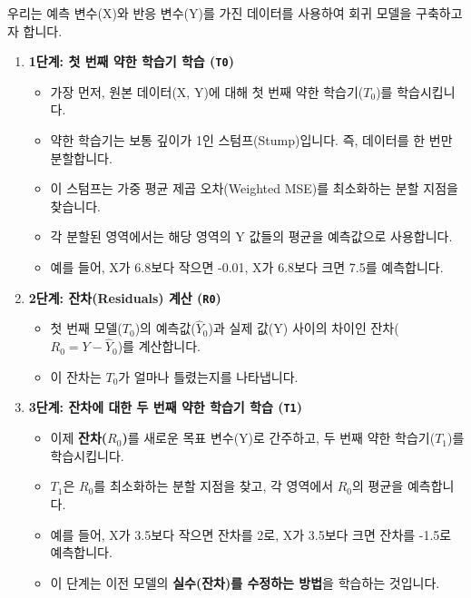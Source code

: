 \documentclass[11pt,a4paper]{book}
\theoremstyle{definition}
\begin{document}
\begin{tcolorbox}[example, title={회귀 문제 예시}] %
우리는 예측 변수(X)와 반응 변수(Y)를 가진 데이터를 사용하여 회귀 모델을 구축하고자 합니다.

\begin{enumerate}
    \item \textbf{1단계: 첫 번째 약한 학습기 학습 (\texttt{T0})}
    \begin{itemize}
        \item 가장 먼저, 원본 데이터(X, Y)에 대해 첫 번째 약한 학습기($T_0$)를 학습시킵니다.
        \item 약한 학습기는 보통 깊이가 1인 스텀프(Stump)입니다. 즉, 데이터를 한 번만 분할합니다.
        \item 이 스텀프는 가중 평균 제곱 오차(Weighted MSE)를 최소화하는 분할 지점을 찾습니다.
        \item 각 분할된 영역에서는 해당 영역의 Y 값들의 평균을 예측값으로 사용합니다.
        \item 예를 들어, X가 6.8보다 작으면 -0.01, X가 6.8보다 크면 7.5를 예측합니다.
    \end{itemize}

    \item \textbf{2단계: 잔차(Residuals) 계산 (\texttt{R0})}
    \begin{itemize}
        \item 첫 번째 모델($T_0$)의 예측값($\hat{Y}_0$)과 실제 값(Y) 사이의 차이인 잔차($R_0 = Y - \hat{Y}_0$)를 계산합니다.
        \item 이 잔차는 $T_0$가 얼마나 틀렸는지를 나타냅니다.
    \end{itemize}

    \item \textbf{3단계: 잔차에 대한 두 번째 약한 학습기 학습 (\texttt{T1})}
    \begin{itemize}
        \item 이제 \textbf{잔차($R_0$)}를 새로운 목표 변수(Y)로 간주하고, 두 번째 약한 학습기($T_1$)를 학습시킵니다.
        \item $T_1$은 $R_0$를 최소화하는 분할 지점을 찾고, 각 영역에서 $R_0$의 평균을 예측합니다.
        \item 예를 들어, X가 3.5보다 작으면 잔차를 2로, X가 3.5보다 크면 잔차를 -1.5로 예측합니다.
        \item 이 단계는 이전 모델의 \textbf{실수(잔차)를 수정하는 방법}을 학습하는 것입니다.
    \end{itemize}


\end{enumerate}
\end{tcolorbox}
\end{document}
